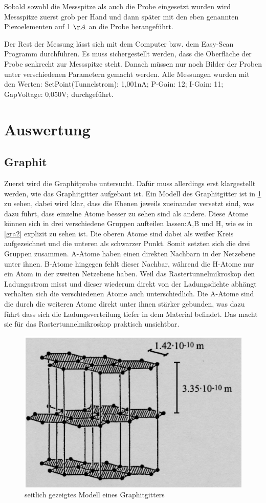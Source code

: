 \documentclass[
	a4paper,
	12pt,
	pagesize,
	ngerman
]{scrartcl}
\begin{document}
Sobald sowohl die Messspitze als auch die Probe eingesetzt wurden wird Messspitze zuerst grob per Hand und dann später mit den eben genannten Piezoelementen auf 1 $\AA$ an die Probe herangeführt. 

Der Rest der Messung lässt sich mit dem Computer bzw. dem Easy-Scan Programm durchführen. Es muss sichergestellt werden, dass die Oberfläche der Probe senkrecht zur Messspitze steht. Danach müssen nur noch Bilder der Proben unter verschiedenen Parametern gemacht werden. 
Alle Messungen wurden mit den Werten: SetPoint(Tunnelstrom): 1,001nA; P-Gain: 12;
I-Gain: 11; GapVoltage: 0,050V; durchgeführt.
\section{Auswertung}
\subsection{Graphit}
Zuerst wird die Graphitprobe untersucht. Dafür muss allerdings erst klargestellt werden, wie das Graphitgitter aufgebaut ist. Ein Modell des Graphitgitter ist in \cref{gra1} zu sehen, dabei wird klar, dass die Ebenen jeweils zueinander versetzt sind, was dazu führt, dass einzelne Atome besser zu sehen sind als andere. Diese Atome können sich in drei verschiedene Gruppen aufteilen lassen:A,B und H, wie es in \cref{gra2} explizit zu sehen ist. Die oberen Atome sind dabei als weißer Kreis aufgezeichnet und die unteren als schwarzer Punkt. Somit setzten sich die drei Gruppen zusammen. A-Atome haben einen direkten Nachbarn in der Netzebene unter ihnen. B-Atome hingegen fehlt dieser Nachbar, während die H-Atome nur ein Atom in der zweiten Netzebene haben. Weil das Rastertunnelmikroskop den Ladungsstrom misst und dieser wiederum direkt von der Ladungsdichte abhängt verhalten sich die verschiedenen Atome auch unterschiedlich. Die A-Atome sind die durch die weiteren Atome direkt unter ihnen stärker gebunden, was dazu führt dass sich die Ladungsverteilung tiefer in dem Material befindet. Das macht sie für das Rastertunnelmikroskop praktisch unsichtbar.

\begin{figure}[h!]
	\centering
	\includegraphics[scale=0.7]{graphitgitter1.png}
	\caption{seitlich gezeigtes Modell eines Graphitgitters}
	\label{gra1}
\end{figure}
\end{document}
